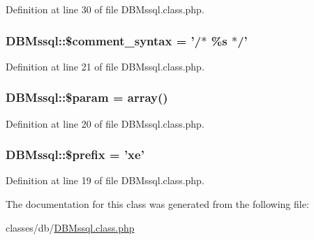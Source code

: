 Definition at line 30 of file D\+B\+Mssql.\+class.\+php.

\hypertarget{classDBMssql_ad095d953d508f44a326586a10c95336d}{
\subsubsection[{\$comment\+\_\+syntax}]{\setlength{\rightskip}{0pt plus 5cm}D\+B\+Mssql\+::\$comment\+\_\+syntax = '/$\ast$ \%s $\ast$/'}}\label{classDBMssql_ad095d953d508f44a326586a10c95336d}


Definition at line 21 of file D\+B\+Mssql.\+class.\+php.

\hypertarget{classDBMssql_a352ee40852cea6dc20de096486603805}{
\subsubsection[{\$param}]{\setlength{\rightskip}{0pt plus 5cm}D\+B\+Mssql\+::\$param = array()}}\label{classDBMssql_a352ee40852cea6dc20de096486603805}


Definition at line 20 of file D\+B\+Mssql.\+class.\+php.

\hypertarget{classDBMssql_a733cd192b424b5a66ea14e3e62391844}{
\subsubsection[{\$prefix}]{\setlength{\rightskip}{0pt plus 5cm}D\+B\+Mssql\+::\$prefix = 'xe'}}\label{classDBMssql_a733cd192b424b5a66ea14e3e62391844}


Definition at line 19 of file D\+B\+Mssql.\+class.\+php.



The documentation for this class was generated from the following file\+:\begin{DoxyCompactItemize}
\item 
classes/db/\hyperlink{DBMssql_8class_8php}{D\+B\+Mssql.\+class.\+php}\end{DoxyCompactItemize}
